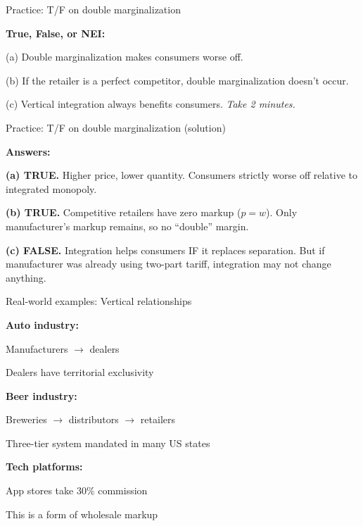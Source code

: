 \documentclass[notes,11pt, aspectratio=169]{beamer}
\newenvironment{wideitemize}{\itemize\addtolength{\itemsep}{10pt}}{\enditemize}
\begin{document}
\begin{frame}{Practice: T/F on double marginalization}
	\begin{wideitemize}
		\item \textbf{True, False, or NEI:}
		\item (a) Double marginalization makes consumers worse off.
		\item (b) If the retailer is a perfect competitor, double marginalization doesn't occur.
		\item (c) Vertical integration always benefits consumers.
	\end{wideitemize}
	\vspace{10pt}
	\centering
	\textit{Take 2 minutes.}
\end{frame}

\begin{frame}{Practice: T/F on double marginalization (solution)}
	\begin{wideitemize}
		\item \textbf{Answers:}
		\item \textbf{(a) TRUE.} Higher price, lower quantity. Consumers strictly worse off relative to integrated monopoly.
		\item \textbf{(b) TRUE.} Competitive retailers have zero markup ($p = w$). Only manufacturer's markup remains, so no ``double'' margin.
		\item \textbf{(c) FALSE.} Integration helps consumers IF it replaces separation. But if manufacturer was already using two-part tariff, integration may not change anything.
	\end{wideitemize}
\end{frame}

\begin{frame}{Real-world examples: Vertical relationships}
	\begin{wideitemize}
		\item \textbf{Auto industry:}
		\begin{wideitemize}
			\vspace{3pt}
			\item Manufacturers $\rightarrow$ dealers
			\item Dealers have territorial exclusivity
		\end{wideitemize}
		\item \textbf{Beer industry:}
		\begin{wideitemize}
			\vspace{3pt}
			\item Breweries $\rightarrow$ distributors $\rightarrow$ retailers
			\item Three-tier system mandated in many US states
		\end{wideitemize}
		\item \textbf{Tech platforms:}
		\begin{wideitemize}
			\vspace{3pt}
			\item App stores take 30\% commission
			\item This is a form of wholesale markup
		\end{wideitemize}
	\end{wideitemize}
\end{frame}
\end{document}
